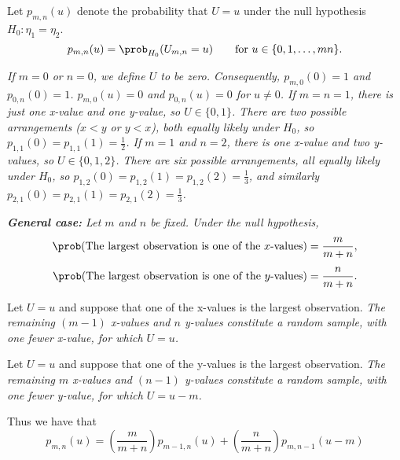
Let $p_{m,n}(u)$ denote the probability that $U = u$ under the null hypothesis $H_0:\eta_1=\eta_2$.
\[
p_{m,n}(u) = \prob_{H_0}(U_{m,n}=u) \text{\qquad for $u\in\{0,1,\ldots,mn\}$.}
\]

%
\ben
\it
If $m = 0$ or $n = 0$, we define $U$ to be zero. Consequently,
\bit
\it $p_{m,0}(0) = 1$ and $p_{0,n}(0) = 1$. 
\it $p_{m,0}(u) = 0$ and $p_{0,n}(u) = 0$ for $u\neq 0$.
\eit
\it
If $m = n = 1$, there is just one x-value and one y-value, so $U\in\{0,1\}$. There are two possible arrangements ($x<y$ or $y<x$), both equally likely under $H_0$, so
\bit
\it $p_{1,1}(0) = p_{1,1}(1) = \frac{1}{2}$.
\eit
\it
If $m=1$ and $n=2$, there is one x-value and two y-values, so $U\in\{0,1,2\}$. There are six possible arrangements,
all equally likely under $H_0$, so
\bit
\it $p_{1,2}(0) = p_{1,2}(1) = p_{1,2}(2) = \frac{1}{3}$, and similarly
\it $p_{2,1}(0) = p_{2,1}(1) = p_{2,1}(2) = \frac{1}{3}$.
\eit

\it \textbf{General case:} Let $m$ and $n$ be fixed. Under the null hypothesis,
\begin{align*}
\prob(\text{The largest observation is one of the $x$-values}) & = \frac{m}{m+n}, \\[1ex]
\prob(\text{The largest observation is one of the $y$-values}) & = \frac{n}{m+n}.
\end{align*}

Let $U=u$ and suppose that one of the x-values is the largest observation.
\bit
\it The remaining $(m - 1)$ x-values and $n$ y-values constitute a random sample, with one fewer x-value, for which $U=u$.
\eit

Let $U=u$ and suppose that one of the y-values is the largest observation.
\bit
\it The remaining $m$ x-values and $(n - 1)$ y-values constitute a random sample, with one fewer y-value, for which $U=u-m$.
\eit

Thus we have that
\[
p_{m,n}(u) = \left(\frac{m}{m+n}\right)p_{m-1,n}(u) + \left(\frac{n}{m+n}\right)p_{m,n-1}(u-m)
\]

